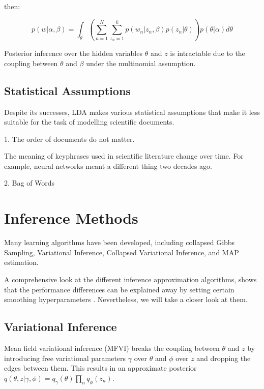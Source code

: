 \documentclass[letterpaper]{article}
\begin{document}
then:

\begin{equation}
  p(w | \alpha, \beta) = \int_\theta \left( \sum_{n=1}^{N}
    \sum_{z_n = 1}^{k} p(w_n | z_n, \beta)p(z_n | \theta) \right)
  p(\theta | \alpha) d\theta
\end{equation}

Posterior inference over the hidden variables $\theta$ and $z$ is
intractable due to the coupling between $\theta$ and $\beta$ under the
multinomial assumption. \citep{blei2003latent}

\subsection{Statistical Assumptions}
\label{subsec:label}
Despite its successes, LDA makes various statistical assumptions that
make it less suitable for the task of modelling scientific documents.

1. The order of documents do not matter.

The meaning of keyphrases used in scientific literature change over
time. For example, neural networks meant a different thing two decades
ago.

2. Bag of Words

\section{Inference Methods}
\label{sec:inference}
Many learning algorithms have been developed, including collapsed
Gibbs Sampling, Variational Inference, Collapsed Variational
Inference, and MAP estimation.

A comprehensive look at the different inference approximation
algorithms, shows that the performance differences can be explained
away by setting certain smoothing hyperparameters
\citep{asuncion-2012-smoot-infer}. Nevertheless, we will take a closer
look at them.

\subsection{Variational Inference}
\label{subsec:variational_inference}
Mean field variational inference (MFVI) breaks the coupling between
$\theta$ and $z$ by introducing free variational parameters $\gamma$
over $\theta$ and $\phi$ over $z$ and dropping the edges between them.
This results in an approximate posterior $q(\theta, z | \gamma, \phi)
= q_\gamma(\theta)\prod_nq_\phi(z_n)$.
\end{document}
